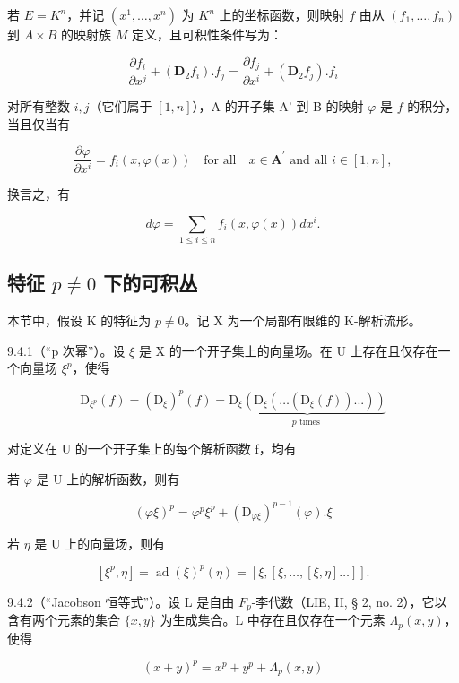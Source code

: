 若 \(E = K^n\)，并记 \((x^1, \ldots, x^n)\) 为 \(K^n\) 上的坐标函数，则映射 \(f\) 由从 \((f_1, \ldots, f_n)\) 到 \(A \times B\) 的映射族 \(M\) 定义，且可积性条件写为：

\[
\frac {\partial f _ {i}}{\partial x ^ {j}} + (\mathbf {D} _ {2} f _ {i}). f _ {j} = \frac {\partial f _ {j}}{\partial x ^ {i}} + (\mathbf {D} _ {2} f _ {j}). f _ {i}
\]

对所有整数 \(i, j\)（它们属于 \([1, n]\)），A 的开子集 A' 到 B 的映射 \(\varphi\) 是 \(f\) 的积分，当且仅当有

\[
\frac {\partial \varphi}{\partial x ^ {i}} = f _ {i} (x, \varphi (x)) \quad \text {for all} \quad x \in \mathbf {A} ^ {\prime} \text { and all } i \in [ 1, n ],
\]

换言之，有

\[
d \varphi = \sum_ {1 \leqslant i \leqslant n} f _ {i} (x, \varphi (x)) d x ^ {i}.
\]

\subsection{\texorpdfstring{特征 \(p \neq 0\) 下的可积丛}{特征 p 非零时的可积丛}}

本节中，假设 K 的特征为 \(p \neq 0\)。记 X 为一个局部有限维的 K-解析流形。

9.4.1（“p 次幂”）。设 \(\xi\) 是 X 的一个开子集上的向量场。在 U 上存在且仅存在一个向量场 \(\xi^p\)，使得

\[
\mathrm{D} _ {\xi^ {p}} (f) = (\mathrm{D} _ {\xi}) ^ {p} (f) = \underbrace {\mathrm{D} _ {\xi} (\mathrm{D} _ {\xi} (\dots (\mathrm{D} _ {\xi} (f)) . . .))} _ {p \text { times }}\tag{1}
\]

对定义在 U 的一个开子集上的每个解析函数 f，均有

若 \(\varphi\) 是 U 上的解析函数，则有

\[
(\varphi \xi) ^ {p} = \varphi^ {p} \xi^ {p} + (\mathrm{D} _ {\varphi \xi}) ^ {p - 1} (\varphi). \xi\tag{2}
\]

若 \(\eta\) 是 U 上的向量场，则有

\[
[ \xi^ {p}, \eta ] = \operatorname{ad}(\xi) ^ {p} (\eta) = [ \xi , [ \xi , \dots , [ \xi , \eta ] \dots ] ].\tag{3}
\]

9.4.2（“Jacobson 恒等式”）。设 L 是自由 \(F_{p}\)-李代数（LIE, II, § 2, no. 2），它以含有两个元素的集合 \(\{x, y\}\) 为生成集合。L 中存在且仅存在一个元素 \(\Lambda_{p}(x, y)\)，使得

\[
(x + y) ^ {p} = x ^ {p} + y ^ {p} + \Lambda_ {p} (x, y)\tag{4}
\]

